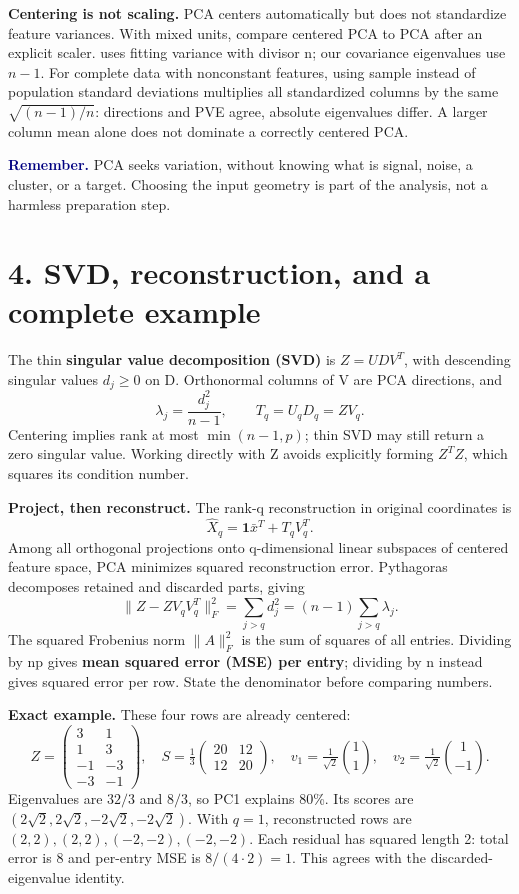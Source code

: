 \documentclass[11pt,a4paper]{article}
\newcommand{\code}[1]{\texttt{\small\detokenize{#1}}}
\newcommand{\idea}[1]{\textcolor{navy}{\textbf{Remember.}} #1}
\begin{document}
\textbf{Centering is not scaling.} PCA centers automatically but does not standardize feature variances.
With mixed units, compare centered PCA to PCA after an explicit scaler.
\code{StandardScaler} uses fitting variance with divisor n; our covariance eigenvalues use $n-1$.
For complete data with nonconstant features, using sample instead of population standard deviations
multiplies all standardized columns by the same $\sqrt{(n-1)/n}$: directions and PVE agree, absolute eigenvalues differ.
A larger column mean alone does not dominate a correctly centered PCA.

\idea{PCA seeks variation, without knowing what is signal, noise, a cluster, or a target.
Choosing the input geometry is part of the analysis, not a harmless preparation step.}

\newpage
\section*{4. SVD, reconstruction, and a complete example}
The thin \textbf{singular value decomposition (SVD)} is $Z=UDV^T$, with descending singular values
$d_j\ge0$ on D. Orthonormal columns of V are PCA directions, and
\[
\boxed{\lambda_j=\frac{d_j^2}{n-1},\qquad T_q=U_qD_q=ZV_q.}
\]
Centering implies rank at most $\min(n-1,p)$; thin SVD may still return a zero singular value.
Working directly with Z avoids explicitly forming $Z^TZ$, which squares its condition number.

\textbf{Project, then reconstruct.} The rank-q reconstruction in original coordinates is
\[
\boxed{\widehat X_q=\mathbf1\bar x^T+T_qV_q^T.}
\]
Among all orthogonal projections onto q-dimensional linear subspaces of centered feature space,
PCA minimizes squared reconstruction error. Pythagoras decomposes retained and discarded parts, giving
\[
\|Z-ZV_qV_q^T\|_F^2=\sum_{j>q}d_j^2=(n-1)\sum_{j>q}\lambda_j.
\]
The squared Frobenius norm $\|A\|_F^2$ is the sum of squares of all entries.
Dividing by np gives \textbf{mean squared error (MSE) per entry}; dividing by n instead gives squared error per row.
State the denominator before comparing numbers.

\textbf{Exact example.} These four rows are already centered:
\[
Z=\begin{pmatrix}3&1\\1&3\\-1&-3\\-3&-1\end{pmatrix},\quad
S=\tfrac13\begin{pmatrix}20&12\\12&20\end{pmatrix},\quad
v_1=\tfrac1{\sqrt2}\binom11,\quad v_2=\tfrac1{\sqrt2}\binom1{-1}.
\]
Eigenvalues are $32/3$ and $8/3$, so PC1 explains 80\%.
Its scores are $(2\sqrt2,2\sqrt2,-2\sqrt2,-2\sqrt2)$.
With $q=1$, reconstructed rows are $(2,2),(2,2),(-2,-2),(-2,-2)$.
Each residual has squared length 2: total error is 8 and per-entry MSE is $8/(4\cdot2)=1$.
This agrees with the discarded-eigenvalue identity.
\end{document}
